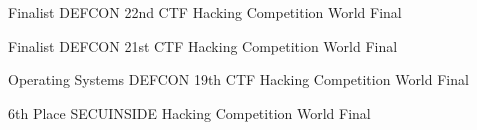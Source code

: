 
\begin{cvskills}

  \cvskill
    {Finalist} %
    {DEFCON 22nd CTF Hacking Competition World Final} %

  \cvskill
    {Finalist} %
    {DEFCON 21st CTF Hacking Competition World Final} %

  \cvskill
    {Operating Systems} %
    {DEFCON 19th CTF Hacking Competition World Final} %

  \cvskill
    {6th Place} %
    {SECUINSIDE Hacking Competition World Final} %

\end{cvskills}
